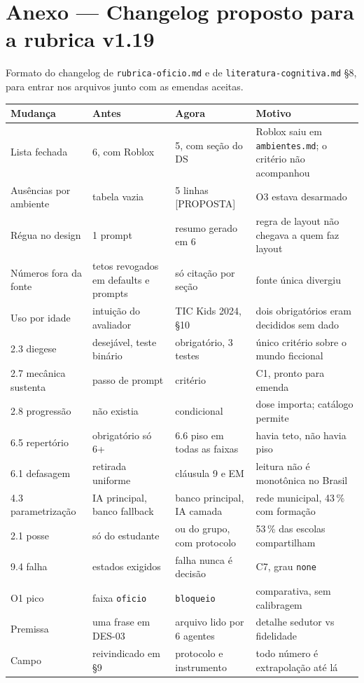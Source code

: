 \documentclass[11pt,a4paper]{article}
\begin{document}
\section{Anexo --- Changelog proposto para a rubrica v1.19}

Formato do changelog de \texttt{rubrica-oficio.md} e de \texttt{literatura-cognitiva.md} \S8, para
entrar nos arquivos junto com as emendas aceitas.

\begin{center}\small
\begin{tabular}{@{}p{3.4cm} p{3.6cm} p{3.6cm} p{4.4cm}@{}}
\toprule
\textbf{Mudança} & \textbf{Antes} & \textbf{Agora} & \textbf{Motivo} \\
\midrule
Lista fechada & 6, com Roblox & 5, com seção do DS & Roblox saiu em \texttt{ambientes.md}; o critério não acompanhou \\
Ausências por ambiente & tabela vazia & 5 linhas [PROPOSTA] & O3 estava desarmado \\
Régua no design & 1 prompt & resumo gerado em 6 & regra de layout não chegava a quem faz layout \\
Números fora da fonte & tetos revogados em defaults e prompts & só citação por seção & fonte única divergiu \\
Uso por idade & intuição do avaliador & TIC Kids 2024, \S10 & dois obrigatórios eram decididos sem dado \\
2.3 diegese & desejável, teste binário & obrigatório, 3 testes & único critério sobre o mundo ficcional \\
2.7 mecânica sustenta & passo de prompt & critério & C1, pronto para emenda \\
2.8 progressão & não existia & condicional & dose importa; catálogo permite \\
6.5 repertório & obrigatório só 6\textordmasculine{}+ & 6.6 piso em todas as faixas & havia teto, não havia piso \\
6.1 defasagem & retirada uniforme & cláusula 9\textordmasculine{} e EM & leitura não é monotônica no Brasil \\
4.3 parametrização & IA principal, banco fallback & banco principal, IA camada & rede municipal, 43\,\% com formação \\
2.1 posse & só do estudante & ou do grupo, com protocolo & 53\,\% das escolas compartilham \\
9.4 falha & estados exigidos & falha nunca é decisão & C7, grau \texttt{none} \\
O1 pico & faixa \texttt{oficio} & \texttt{bloqueio} & comparativa, sem calibragem \\
Premissa & uma frase em DES-03 & arquivo lido por 6 agentes & detalhe sedutor vs fidelidade \\
Campo & reivindicado em \S9 & protocolo e instrumento & todo número é extrapolação até lá \\
\bottomrule
\end{tabular}
\end{center}
\end{document}

